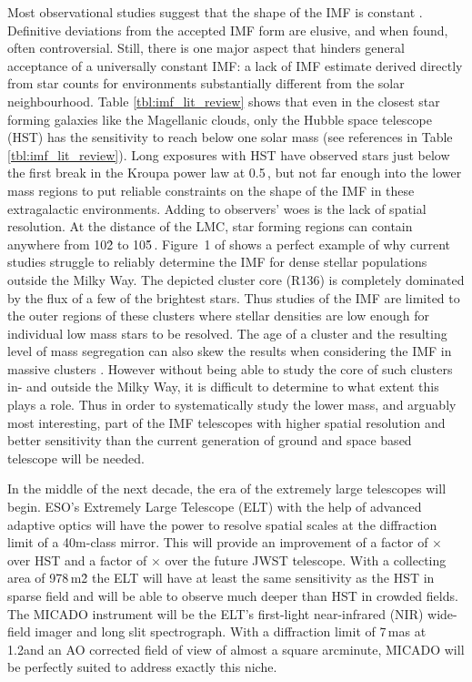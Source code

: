 Most observational studies suggest that the shape of the IMF is constant \citep{Kroupa2002,Bastian2010}. 
Definitive deviations from the accepted IMF form are elusive, and when found, often controversial\needcite. 
Still, there is one major aspect that hinders general acceptance of a universally constant IMF: a lack of IMF estimate derived directly from star counts for environments substantially different from the solar neighbourhood. 
Table \ref{tbl:imf_lit_review} shows that even in the closest star forming galaxies like the Magellanic clouds, only the Hubble space telescope (HST) has the sensitivity to reach below one solar mass (see references in Table \ref{tbl:imf_lit_review}). 
Long exposures with HST have observed stars just below the first break in the Kroupa power law at 0.5\,\msun \citep{dario2009,kalirai2013,geha2013}, but not far enough into the lower mass regions to put reliable constraints on the shape of the IMF in these extragalactic environments. 
Adding to observers' woes is the lack of spatial resolution. At the distance of the LMC, star forming regions can contain anywhere from 10\h2 to 10\h5\,\spa. 
Figure~1 of \citet{sirianni2000} shows a perfect example of why current studies struggle to reliably determine the IMF for dense stellar populations outside the Milky Way. The depicted cluster core (R136) is completely dominated by the flux of a few of the brightest stars.
Thus studies of the IMF are limited to the outer regions of these clusters where stellar densities are low enough for individual low mass stars to be resolved. 
The age of a cluster and the resulting level of mass segregation can also skew the results when considering the IMF in massive clusters \citep{lim2013}\needcite. 
However without being able to study the core of such clusters in- and outside the Milky Way, it is difficult to determine to what extent this plays a role. Thus in order to systematically study the lower mass, and arguably most interesting, part of the IMF telescopes with higher spatial resolution and better sensitivity than the current generation of ground and space based telescope will be needed.

In the middle of the next decade, the era of the extremely large telescopes will begin. 
ESO's Extremely Large Telescope (ELT) \citep{eelt} with the help of advanced adaptive optics \citep{maory} will have the power to resolve spatial scales at the diffraction limit of a 40m-class mirror. This will provide an improvement of a factor of $\times$ over HST and a factor of $\times$ over the future JWST telescope. 
With a collecting area of 978\,m\h2 the ELT will have at least the same sensitivity as the HST in sparse field and will be able to observe much deeper than HST in crowded fields. 
The MICADO instrument \citep{micado, micado2016} will be the ELT's first-light near-infrared (NIR) wide-field imager and long slit spectrograph. 
With a diffraction limit of 7\,mas at 1.2\um and an AO corrected field of view of almost a square arcminute, MICADO will be perfectly suited to address exactly this niche. 

